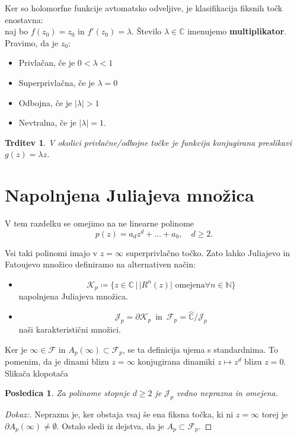 \documentclass{article}
\newtheorem{trditev}{Trditev}
\newtheorem{posledica}{Posledica}
\newcommand{\C}{\mathbb{C}}
\newcommand{\N}{\mathbb{N}}
\newcommand{\F}{\mathcal{F}}
\begin{document}
Ker so holomorfne funkcije avtomatsko odveljive, je klasifikacija
fiksnih točk enostavna: \\
naj bo $f(z_0) = z_0$ in $f'(z_0) = \lambda$. Število $\lambda \in \C$
imenujemo \textbf{multiplikator}.
Pravimo, da je $z_0$:
\begin{itemize}
    \item Privlačan, če je $0 < \lambda < 1$
    \item Superprivlačna, če je $\lambda = 0$
    \item Odbojna, če je $|\lambda| > 1$ 
    \item Nevtralna, če je $|\lambda| = 1$.
\end{itemize}

\begin{trditev}
V okolici privlačne\slash odbojne točke je funkcija konjugirana 
preslikavi $g(z) = \lambda z$.
\end{trditev}



\section{Napolnjena Juliajeva množica}

V tem razdelku se omejimo na ne linearne polinome
$$
p(z) = a_d z^d + \dots + a_0, \quad d \geq 2.
$$

Vsi taki polinomi imajo v $z = \infty$ superprivlačno točko. Zato lahko Juliajevo 
in Fatoujevo množico definiramo na alternativen način:
\begin{itemize}
    \item  
$$
\mathcal{K}_p \coloneqq \{z\in \C \,|\, |R^n(z)| \text{ omejena} \forall n\in \N\}
$$
napolnjena Juliajeva množica.
\item 
$$
\mathcal{J}_p = \partial \mathcal{K}_p \,\text{ in }\, \mathcal{F}_p = \hat{\C}\slash \mathcal{J}_p
$$
naši karakteristični množici. 
\end{itemize}
Ker je $\infty \in \F$ in $A_p(\infty) \subset \F_p$, se ta definicija 
ujema s standardnima. To pomenim, da je dinami blizu $z = \infty$ 
konjugirana dinamiki $z \mapsto z^d$ blizu $z = 0$.\\
Slikača klopotača\\
\begin{posledica}
Za polinome stopnje $d\geq 2$ je $\mathcal{J}_p$ vedno neprazna in omejena.
\end{posledica}

\begin{proof}[Dokaz:]
    Neprazna je, ker obstaja vsaj še ena fiksna točka, ki ni $z = \infty$
    torej je $\partial A_p(\infty) \neq \emptyset$. Ostalo sledi iz dejstva, 
    da je $A_p \subset \F_p$.
\end{proof}
\end{document}
